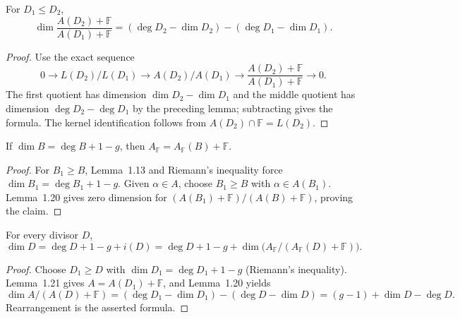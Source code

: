 \begin{lemma}
\label{par-lem-adele-mod-F}
\uses{}
For $D_1\leq D_2$,
\[
\dim\frac{A(D_2)+\mathbb F}{A(D_1)+\mathbb F}
=(\deg D_2-\dim D_2)-(\deg D_1-\dim D_1).
\]
\end{lemma}
\begin{proof}
Use the exact sequence
\[
0\to L(D_2)/L(D_1)\to A(D_2)/A(D_1)
\to\frac{A(D_2)+\mathbb F}{A(D_1)+\mathbb F}\to0.
\]
The first quotient has dimension $\dim D_2-\dim D_1$ and the middle quotient
has dimension $\deg D_2-\deg D_1$ by the preceding lemma; subtracting gives the
formula. The kernel identification follows from $A(D_2)\cap\mathbb F=L(D_2)$.
\end{proof}

\begin{lemma}
\label{par-lem-adele-stable}
\uses{}
If $\dim B=\deg B+1-g$, then
$A_{\mathbb F}=A_{\mathbb F}(B)+\mathbb F$.
\end{lemma}
\begin{proof}
For $B_1\geq B$, Lemma~1.13 and Riemann's inequality force
$\dim B_1=\deg B_1+1-g$. Given $\alpha\in A$, choose $B_1\geq B$ with
$\alpha\in A(B_1)$. Lemma~1.20 gives zero dimension for
$(A(B_1)+\mathbb F)/(A(B)+\mathbb F)$, proving the claim.
\end{proof}

\begin{theorem}
\label{par-thm-adelic-preliminary}
\uses{}
For every divisor $D$,
\[
\dim D=\deg D+1-g+i(D)
=\deg D+1-g+\dim\bigl(A_{\mathbb F}/(A_{\mathbb F}(D)+\mathbb F)\bigr).
\]
\end{theorem}
\begin{proof}
Choose $D_1\geq D$ with $\dim D_1=\deg D_1+1-g$ (Riemann's inequality).
Lemma~1.21 gives $A=A(D_1)+\mathbb F$, and Lemma~1.20 yields
\[
\dim A/(A(D)+\mathbb F)=(\deg D_1-\dim D_1)-(\deg D-\dim D)
=(g-1)+\dim D-\deg D.
\]
Rearrangement is the asserted formula.
\end{proof}

